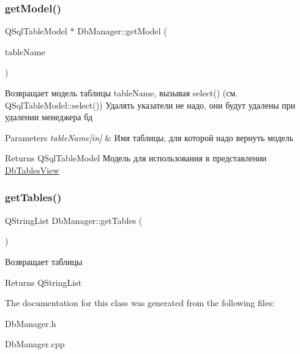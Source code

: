 \subsubsection{\texorpdfstring{get\+Model()}{getModel()}}
{\footnotesize\ttfamily Q\+Sql\+Table\+Model $\ast$ Db\+Manager\+::get\+Model (\begin{DoxyParamCaption}\item[{const Q\+String \&}]{table\+Name }\end{DoxyParamCaption})}



Возвращает модель таблицы table\+Name, вызывая select() (см. Q\+Sql\+Table\+Model\+::select()) Удалять указатели не надо, они будут удалены при удалении менеджера бд 


\begin{DoxyParams}{Parameters}
{\em table\+Name\mbox{[}in\mbox{]}} & Имя таблицы, для которой надо вернуть модель \\
\hline
\end{DoxyParams}
\begin{DoxyReturn}{Returns}
Q\+Sql\+Table\+Model Модель для использования в представлении \hyperlink{class_db_tables_view}{Db\+Tables\+View} 
\end{DoxyReturn}
\mbox{\label{class_db_manager_a56efe9d49dc68dcdef05ae834f7618b0}} 
\subsubsection{\texorpdfstring{get\+Tables()}{getTables()}}
{\footnotesize\ttfamily Q\+String\+List Db\+Manager\+::get\+Tables (\begin{DoxyParamCaption}{ }\end{DoxyParamCaption})}



Возвращает таблицы 

\begin{DoxyReturn}{Returns}
Q\+String\+List 
\end{DoxyReturn}


The documentation for this class was generated from the following files\+:\begin{DoxyCompactItemize}
\item 
Db\+Manager.\+h\item 
Db\+Manager.\+cpp\end{DoxyCompactItemize}
